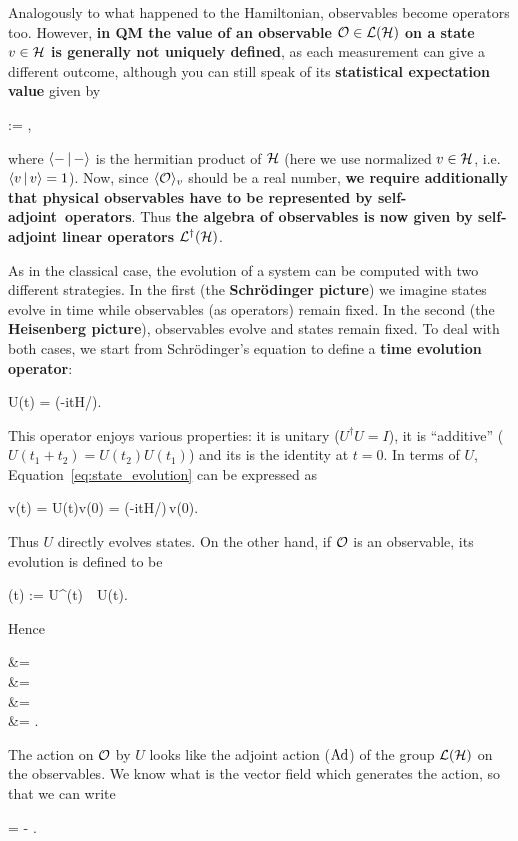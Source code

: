 \documentclass[main.tex]{subfiles}
\begin{document}
Analogously to what happened to the Hamiltonian, observables become operators too. However, \textbf{in QM the value of an observable $\mathcal{O} \in \mathcal{L}(\mathcal{H})$ on a state $v \in \mathcal{H}$ is generally not uniquely defined}, as each measurement can give a different outcome, although you can still speak of its \textbf{statistical expectation value} given by
\begin{eqalign}
	 := ,
\end{eqalign}
where $\langle {-} \,|\, {-} \rangle$ is the hermitian product of $\mathcal{H}$ (here we use normalized $v \in \mathcal{H}$, i.e. $\langle {v} \,|\, {v} \rangle = 1$). Now, since $\langle {\mathcal{O}} \rangle_{v}$ should be a real number, \textbf{we require additionally that physical observables have to be represented by self-adjoint\footnotemark\ operators}. Thus \textbf{the algebra of observables is now given by self-adjoint linear operators $\mathcal{L}^\dagger(\mathcal{H})$}.

As in the classical case, the evolution of a system can be computed with two different strategies. In the first (the \textbf{Schr\"odinger picture}) we imagine states evolve in time while observables (as operators) remain fixed. In the second (the \textbf{Heisenberg picture}), observables evolve and states remain fixed. To deal with both cases, we start from Schr\"odinger's equation to define a \textbf{time evolution operator}:
\begin{eqalign}
	U(t) = \exp(-itH/\planck).
\end{eqalign}
This operator enjoys various properties: it is unitary ($U^\dagger U = I$), it is ``additive'' ($U(t_1+t_2)=U(t_2)U(t_1)$) and its is the identity at $t=0$. In terms of $U$, Equation~\eqref{eq:state_evolution} can be expressed as
\begin{eqalign}
	v(t) = U(t)v(0) = \exp(-itH/\planck)\,v(0).
\end{eqalign}
Thus $U$ directly evolves states. On the other hand, if $\mathcal{O}$ is an observable, its evolution is defined to be
\begin{eqalign}
	\obs(t) := U^\dagger(t)\, \obs\, U(t).
\end{eqalign}
Hence
\begin{eqalign}
	 &= \\
	&= \\
	&= \\
	&= .
\end{eqalign}
The action on $\mathcal{O}$ by $U$ looks like the adjoint action ($\operatorname{Ad}$) of the group $\mathcal{L}(\mathcal{H})$ on the observables. We know what is the vector field which generates the action, so that we can write
\begin{eqalign}
\label{eq:qm_evolution}
	 = - \planck [\obs(t), H].
\end{eqalign}
\end{document}
